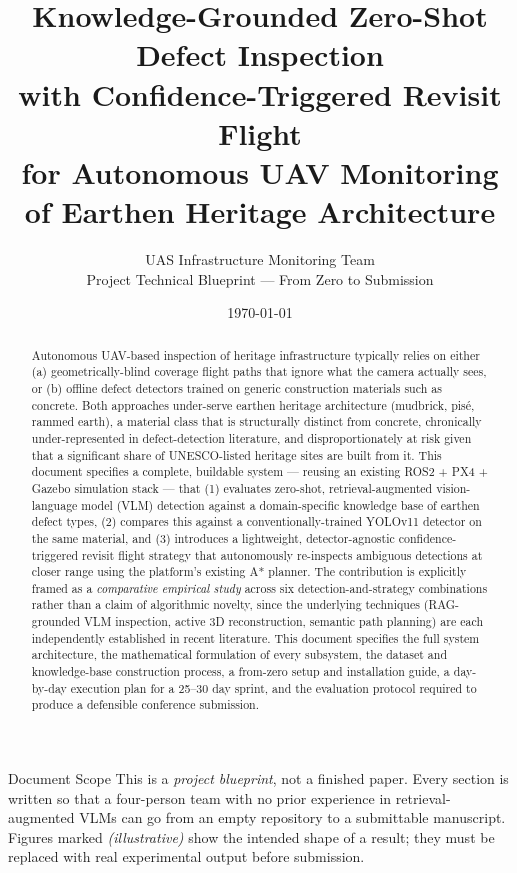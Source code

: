 \documentclass[11pt,a4paper]{article}
\title{
  \vspace{-1.5cm}
  \color{primaryblue}\Huge\bfseries
  Knowledge-Grounded Zero-Shot Defect Inspection\\[0.3em]
  \Large with Confidence-Triggered Revisit Flight\\[0.3em]
  \large for Autonomous UAV Monitoring of Earthen Heritage Architecture
  \vspace{0.3cm}
}
\author{UAS Infrastructure Monitoring Team \\ \small Project Technical Blueprint --- From Zero to Submission}
\date{\small \today}
\begin{document}
\maketitle
\thispagestyle{empty}

\begin{abstract}
\noindent
Autonomous UAV-based inspection of heritage infrastructure typically relies on either (a) geometrically-blind coverage flight paths that ignore what the camera actually sees, or (b) offline defect detectors trained on generic construction materials such as concrete. Both approaches under-serve earthen heritage architecture (mudbrick, pisé, rammed earth), a material class that is structurally distinct from concrete, chronically under-represented in defect-detection literature, and disproportionately at risk given that a significant share of UNESCO-listed heritage sites are built from it. This document specifies a complete, buildable system --- reusing an existing ROS2 + PX4 + Gazebo simulation stack --- that (1) evaluates zero-shot, retrieval-augmented vision-language model (VLM) detection against a domain-specific knowledge base of earthen defect types, (2) compares this against a conventionally-trained YOLOv11 detector on the same material, and (3) introduces a lightweight, detector-agnostic confidence-triggered revisit flight strategy that autonomously re-inspects ambiguous detections at closer range using the platform's existing A* planner. The contribution is explicitly framed as a \emph{comparative empirical study} across six detection-and-strategy combinations rather than a claim of algorithmic novelty, since the underlying techniques (RAG-grounded VLM inspection, active 3D reconstruction, semantic path planning) are each independently established in recent literature. This document specifies the full system architecture, the mathematical formulation of every subsystem, the dataset and knowledge-base construction process, a from-zero setup and installation guide, a day-by-day execution plan for a 25--30 day sprint, and the evaluation protocol required to produce a defensible conference submission.
\end{abstract}

\vspace{0.5cm}
\begin{keybox}{Document Scope}
This is a \emph{project blueprint}, not a finished paper. Every section is written so that a four-person team with no prior experience in retrieval-augmented VLMs can go from an empty repository to a submittable manuscript. Figures marked \emph{(illustrative)} show the intended shape of a result; they must be replaced with real experimental output before submission.
\end{keybox}
\end{document}
